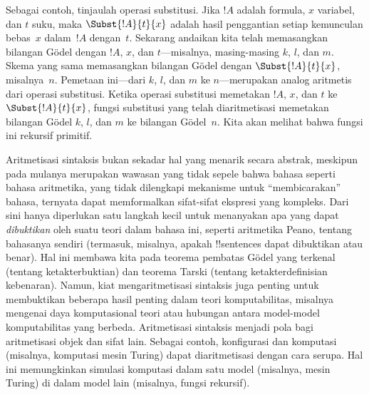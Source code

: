 \documentclass[../../../include/open-logic-section]{subfiles}
\begin{document}
Sebagai contoh, tinjaulah operasi substitusi. Jika $!A$ adalah formula, $x$
variabel, dan $t$ suku, maka $\Subst{!A}{t}{x}$ adalah hasil penggantian setiap
kemunculan bebas~$x$ dalam~$!A$ dengan~$t$. Sekarang andaikan kita telah
memasangkan bilangan G\"odel dengan $!A$, $x$, dan $t$---misalnya, masing-masing
$k$, $l$, dan $m$. Skema yang sama memasangkan bilangan G\"odel dengan
$\Subst{!A}{t}{x}$, misalnya~$n$. Pemetaan ini---dari $k$, $l$, dan $m$ ke
$n$---merupakan analog aritmetis dari operasi substitusi. Ketika operasi
substitusi memetakan $!A$, $x$, dan $t$ ke $\Subst{!A}{t}{x}$, fungsi
substitusi yang telah diaritmetisasi memetakan bilangan G\"odel $k$, $l$, dan
$m$ ke bilangan G\"odel~$n$. Kita akan melihat bahwa fungsi ini rekursif
primitif.

Aritmetisasi sintaksis bukan sekadar hal yang menarik secara abstrak,
meskipun pada mulanya merupakan wawasan yang tidak sepele bahwa bahasa seperti
bahasa aritmetika, yang tidak dilengkapi mekanisme untuk ``membicarakan''
bahasa, ternyata dapat memformalkan sifat-sifat ekspresi yang kompleks. Dari
sini hanya diperlukan satu langkah kecil untuk menanyakan apa yang dapat
\emph{dibuktikan} oleh suatu teori dalam bahasa ini, seperti aritmetika Peano,
tentang bahasanya sendiri (termasuk, misalnya, apakah !!{sentence}s dapat
dibuktikan atau benar). Hal ini membawa kita pada teorema pembatas G\"odel
yang terkenal (tentang ketakterbuktian) dan teorema Tarski (tentang
ketakterdefinisian kebenaran). Namun, kiat mengaritmetisasi sintaksis juga
penting untuk membuktikan beberapa hasil penting dalam teori komputabilitas,
misalnya mengenai daya komputasional teori atau hubungan antara model-model
komputabilitas yang berbeda. Aritmetisasi sintaksis menjadi pola bagi
aritmetisasi objek dan sifat lain. Sebagai contoh, konfigurasi dan komputasi
(misalnya, komputasi mesin Turing) dapat diaritmetisasi dengan cara serupa.
Hal ini memungkinkan simulasi komputasi dalam satu model (misalnya, mesin
Turing) di dalam model lain (misalnya, fungsi rekursif).
\end{document}
